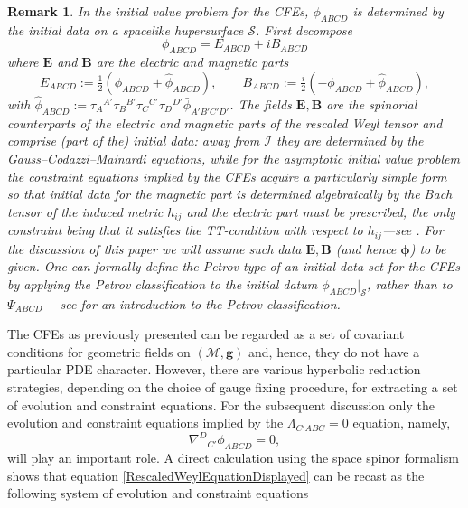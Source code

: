 \documentclass[10pt,a4paper]{article}
\theoremstyle{plain}
\newtheorem{remark}{Remark}
\def\bmg{{\bm g}}
\def\bmB{{\bm B}}
\def\bmE{{\bm E}}
\begin{document}
 \begin{remark}
 \label{G-C-M-Remark}
   \emph{In the initial value problem for the CFEs, $\phi_{ABCD}$ is
   determined by the initial data on a spacelike hupersurface
   $\mathcal{S}$. First decompose
   \[ \phi_{ABCD}=E_{ABCD}+iB_{ABCD}\]
where $\bmE$ and $\bmB$ are the \textit{electric} and
\textit{magnetic} parts
   \[
   E_{ABCD} := \tfrac{1}{2}(\phi_{ABCD} + \hat{\phi}_{ABCD}),\qquad
   B_{ABCD} := \tfrac{i}{2}(-\phi_{ABCD} + \hat{\phi}_{ABCD}),
  \]
  with
  $\hat{\phi}_{ABCD}:=\tau_A{}^{A'}\tau_B{}^{B'}\tau_C{}^{C'}\tau_D{}^{D'}\bar{\phi}_{A'B'C'D'}$. The
  fields $\bmE,\bmB$ are the spinorial counterparts of the electric
  and magnetic parts of the rescaled Weyl tensor and comprise (part of
  the) initial data: away from $\mathscr{I}$ they are determined by
  the Gauss--Codazzi--Mainardi equations, while for the asymptotic
  initial value problem the constraint equations implied by the CFEs
  acquire a particularly simple form so that initial data for the
  magnetic part is determined algebraically by the Bach tensor of the
  induced metric $h_{ij}$ and the electric part must be prescribed,
  the only constraint being that it satisfies the
  \textit{TT}-condition with respect to $h_{ij}$---see \cite{CFEbook,
    GasVal17a}.  For the discussion of this paper we will assume such
  data $\bmE, \bmB$ (and hence $\bm\phi$) to be given.  One can
  formally define the Petrov type of an initial data set for the CFEs
  by applying the Petrov classification to the initial datum
  $\phi_{ABCD}|_{\mathcal{S}}$, rather than to $\Psi_{ABCD}$ ---see
  \cite{Ste91} for an introduction to the Petrov classification.  }
\end{remark}
The CFEs as previously presented can be regarded as a set of covariant
conditions for geometric fields on $(\mathcal{M},\bmg)$ and, hence,
they do not have a particular PDE character.  However, there are
various hyperbolic reduction strategies, depending on the choice of
gauge fixing procedure, for extracting a set of evolution and
constraint equations.  For the subsequent discussion only the
evolution and constraint equations implied by the $\Lambda_{C'ABC}=0$
equation, namely,
\begin{equation}\label{RescaledWeylEquationDisplayed}
 \nabla^D{}_{C'}\phi _{ABCD}=0,
\end{equation}
will play an important role.  A direct calculation using the space
spinor formalism shows that equation
\eqref{RescaledWeylEquationDisplayed} can be recast as the following
system of evolution and constraint equations
\end{document}
